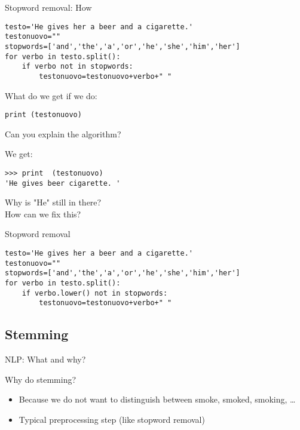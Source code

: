 \documentclass{beamer}
\begin{document}
\begin{frame}[fragile]{Stopword removal: How}
\begin{lstlisting}
testo='He gives her a beer and a cigarette.'
testonuovo=""
stopwords=['and','the','a','or','he','she','him','her']
for verbo in testo.split():
    if verbo not in stopwords:
        testonuovo=testonuovo+verbo+" "
\end{lstlisting}
What do we get if we do:
\begin{lstlisting}
print (testonuovo)
\end{lstlisting}
Can you explain the algorithm?
\end{frame}

\begin{frame}[fragile]{We get:}
\begin{lstlisting}
>>> print  (testonuovo)
'He gives beer cigarette. '
\end{lstlisting}
Why is "He" still in there? \\ How can we fix this?
\end{frame}

\begin{frame}[fragile]{Stopword removal}
\begin{lstlisting}
testo='He gives her a beer and a cigarette.'
testonuovo=""
stopwords=['and','the','a','or','he','she','him','her']
for verbo in testo.split():
    if verbo.lower() not in stopwords:
        testonuovo=testonuovo+verbo+" "
\end{lstlisting}
\end{frame}












\subsection{Stemming}
\begin{frame}{NLP: What and why?}
\begin{block}{Why do stemming?}
\begin{itemize}
\item Because we do not want to distinguish between smoke, smoked, smoking, \ldots
\item Typical preprocessing step (like stopword removal)
\end{itemize}
\end{block}
\end{frame}
\end{document}
